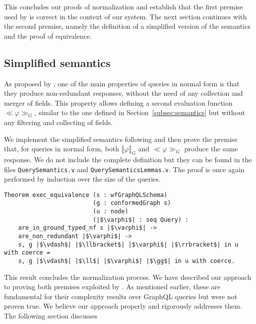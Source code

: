 This concludes our proofs of normalization and establish that the first premise used by \HP{} is correct in the context of our system.
The next section continues with the second premise, namely the definition of a simplified version of the semantics
and the proof of equivalence.

\subsection{Simplified semantics}

As proposed by \HP{}, one of the main properties of queries in normal form is that they produce non-redundant responses, without the need of any collection and merger of fields. This property allows defining a second evaluation function $\ll \varphi \gg_{G}$, similar to the one defined in Section~\ref{subsec:semantics} but without any filtering and collecting of fields.

We implement the simplified semantics following \HP{} and then prove the premise that, for queries in normal form, both $\llbracket \varphi \rrbracket_{G}$ and $\ll \varphi \gg_{G}$ produce the same response. We do not include the complete definition but they can be found in the files \texttt{QuerySemantics.v} and \texttt{QuerySemanticsLemmas.v}. The proof is once again performed by induction over the size of the queries.

\begin{verbatim}
Theorem exec_equivalence (s : wfGraphQLSchema)
                         (g : conformedGraph s)
                         (u : node)
                         (|$\varphi$| : seq Query) :
    are_in_ground_typed_nf s |$\varphi$| ->
    are_non_redundant |$\varphi$| ->
    s, g |$\vdash$| |$\llbracket$| |$\varphi$| |$\rrbracket$| in u with coerce =
    s, g |$\vdash$| |$\ll$| |$\varphi$| |$\gg$| in u with coerce.
\end{verbatim}

This result concludes the normalization process. We have described our approach to proving both premises exploited by \HP{}. As mentioned earlier, these are fundamental for their complexity results over GraphQL queries but were not proven true. We believe our approach properly and rigorously addresses them. The following section discusses
